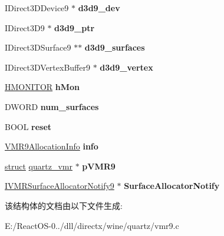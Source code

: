 \begin{DoxyCompactItemize}
\mbox{\label{struct_v_m_r9_default_allocator_presenter_impl_a79aca38abdef9a65f3566204e9b4b66b}} 
I\+Direct3\+D\+Device9 $\ast$ {\bfseries d3d9\+\_\+dev}
\item 
\mbox{\label{struct_v_m_r9_default_allocator_presenter_impl_ad73fab8243cbc6d6eb8dffc26c9c6483}} 
I\+Direct3\+D9 $\ast$ {\bfseries d3d9\+\_\+ptr}
\item 
\mbox{\label{struct_v_m_r9_default_allocator_presenter_impl_a918a896709176c3dc8abf703f45aab83}} 
I\+Direct3\+D\+Surface9 $\ast$$\ast$ {\bfseries d3d9\+\_\+surfaces}
\item 
\mbox{\label{struct_v_m_r9_default_allocator_presenter_impl_afdf1a51bcd8b2e8c360823b3122b573b}} 
I\+Direct3\+D\+Vertex\+Buffer9 $\ast$ {\bfseries d3d9\+\_\+vertex}
\item 
\mbox{\label{struct_v_m_r9_default_allocator_presenter_impl_ad6c29a1a2847a3550ae7de536e73b196}} 
\hyperlink{interfacevoid}{H\+M\+O\+N\+I\+T\+OR} {\bfseries h\+Mon}
\item 
\mbox{\label{struct_v_m_r9_default_allocator_presenter_impl_a89ef7d4fb68037cec39cb36ec9662f1a}} 
D\+W\+O\+RD {\bfseries num\+\_\+surfaces}
\item 
\mbox{\label{struct_v_m_r9_default_allocator_presenter_impl_a852239d7cd9e3a307a0c830c8dc67334}} 
B\+O\+OL {\bfseries reset}
\item 
\mbox{\label{struct_v_m_r9_default_allocator_presenter_impl_a11135735bfa866862e218cd9b0718853}} 
\hyperlink{struct___v_m_r9_allocation_info}{V\+M\+R9\+Allocation\+Info} {\bfseries info}
\item 
\mbox{\label{struct_v_m_r9_default_allocator_presenter_impl_ae3ff9295608902988f11114bd39001d9}} 
\hyperlink{interfacestruct}{struct} \hyperlink{structquartz__vmr}{quartz\+\_\+vmr} $\ast$ {\bfseries p\+V\+M\+R9}
\item 
\mbox{\label{struct_v_m_r9_default_allocator_presenter_impl_a5934a8e71c3391057cd36b826877f00c}} 
\hyperlink{interface_i_v_m_r_surface_allocator_notify9}{I\+V\+M\+R\+Surface\+Allocator\+Notify9} $\ast$ {\bfseries Surface\+Allocator\+Notify}
\end{DoxyCompactItemize}


该结构体的文档由以下文件生成\+:\begin{DoxyCompactItemize}
\item 
E\+:/\+React\+O\+S-\/0../dll/directx/wine/quartz/vmr9.\+c\end{DoxyCompactItemize}
